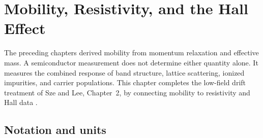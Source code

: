 \chapter{Mobility, Resistivity, and the Hall Effect}
\label{ch:mobility-resistivity-hall}

The preceding chapters derived mobility from momentum relaxation and effective
mass.  A semiconductor measurement does not determine either quantity alone.
It measures the combined response of band structure, lattice scattering,
ionized impurities, and carrier populations.  This chapter completes the
low-field drift treatment of Sze and Lee, Chapter~2, by connecting mobility to
resistivity and Hall data \cite[Chap.~2]{szeLee2012}.

\section{Notation and units}

